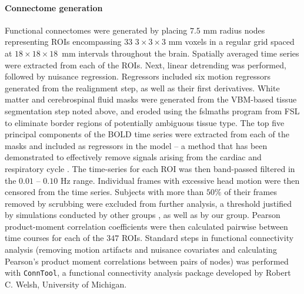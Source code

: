 \paragraph{Connectome generation}
Functional connectomes were generated by placing $7.5$ mm radius nodes representing ROIs encompassing $33$ $3\times 3\times 3$ mm voxels in a regular grid spaced at $18\times 18 \times 18$~mm intervals throughout the brain. 
Spatially averaged time series were extracted from each of the ROIs. 
Next, linear detrending was performed, followed by nuisance regression. 
Regressors included six motion regressors generated from the realignment step, as well as their first derivatives. 
White matter and cerebrospinal fluid masks were generated from the VBM-based tissue segmentation step noted above, and eroded using the \textsf{fslmaths} program from FSL to eliminate border regions of potentially ambiguous tissue type. 
The top five principal components of the BOLD time series were extracted from each of the masks and included as regressors in the model -- a method that has been demonstrated to effectively remove signals arising from the cardiac and respiratory cycle \citep{Behzadi:2007}. 
The time-series for each ROI was then band-passed filtered in the $0.01$ -- $0.10$ Hz range. 
Individual frames with excessive head motion were then censored from the time series. 
Subjects with more than $50\%$ of their frames removed by scrubbing were excluded from further analysis, a threshold justified by simulations conducted by other groups \citep{Fair:2013}, as well as by our group. 
Pearson product-moment correlation coefficients were then calculated pairwise between time courses for each of the $347$ ROIs.
Standard steps in functional connectivity analysis (removing motion artifacts and nuisance covariates and calculating Pearson's product moment correlations between pairs of nodes) was performed with \texttt{ConnTool}, a functional connectivity analysis package developed by Robert C. Welsh, University of Michigan.
